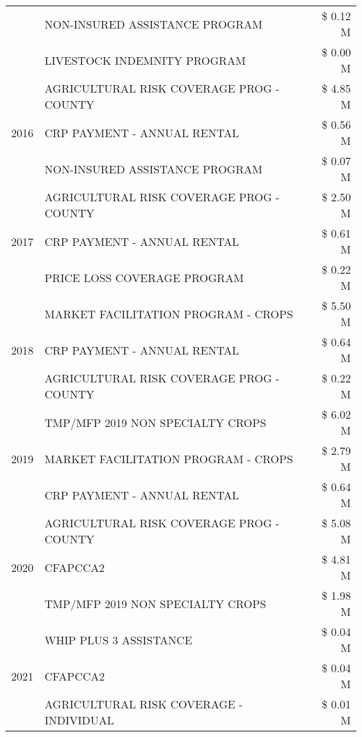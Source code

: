 \begin{tabular}{llr}
 & NON-INSURED ASSISTANCE PROGRAM & \$ 0.12 M \\
 & LIVESTOCK INDEMNITY PROGRAM & \$ 0.00 M \\
\cline{1-3}
\multirow[t]{3}{*}{2016} & AGRICULTURAL RISK COVERAGE PROG - COUNTY      & \$ 4.85 M \\
 & CRP PAYMENT - ANNUAL RENTAL                   & \$ 0.56 M \\
 & NON-INSURED ASSISTANCE PROGRAM                & \$ 0.07 M \\
\cline{1-3}
\multirow[t]{3}{*}{2017} & AGRICULTURAL RISK COVERAGE PROG - COUNTY & \$ 2.50 M \\
 & CRP PAYMENT - ANNUAL RENTAL & \$ 0.61 M \\
 & PRICE LOSS COVERAGE PROGRAM & \$ 0.22 M \\
\cline{1-3}
\multirow[t]{3}{*}{2018} & MARKET FACILITATION PROGRAM - CROPS & \$ 5.50 M \\
 & CRP PAYMENT - ANNUAL RENTAL & \$ 0.64 M \\
 & AGRICULTURAL RISK COVERAGE PROG - COUNTY & \$ 0.22 M \\
\cline{1-3}
\multirow[t]{3}{*}{2019} & TMP/MFP 2019 NON SPECIALTY CROPS & \$ 6.02 M \\
 & MARKET FACILITATION PROGRAM - CROPS & \$ 2.79 M \\
 & CRP PAYMENT - ANNUAL RENTAL & \$ 0.64 M \\
\cline{1-3}
\multirow[t]{3}{*}{2020} & AGRICULTURAL RISK COVERAGE PROG - COUNTY & \$ 5.08 M \\
 & CFAPCCA2 & \$ 4.81 M \\
 & TMP/MFP 2019 NON SPECIALTY CROPS & \$ 1.98 M \\
\cline{1-3}
\multirow[t]{3}{*}{2021} & WHIP PLUS 3 ASSISTANCE & \$ 0.04 M \\
 & CFAPCCA2 & \$ 0.04 M \\
 & AGRICULTURAL RISK COVERAGE - INDIVIDUAL & \$ 0.01 M \\
\cline{1-3}
\bottomrule
\end{tabular}
